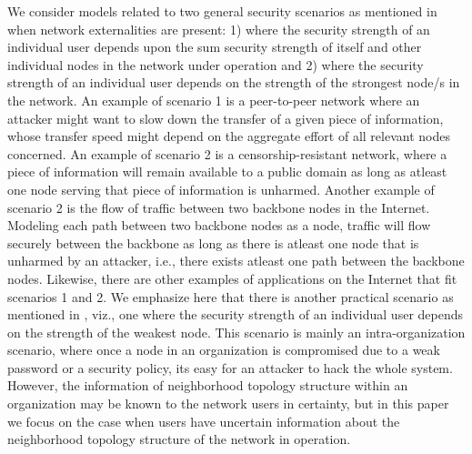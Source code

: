 \documentclass[letterpaper,12pt,onecolumn, nodraft]{IEEEtran}
\begin{document}
We consider models related to two general security scenarios as mentioned in \cite{hvar} when network externalities are present: 1) where the security strength of an individual user depends upon the sum security strength of itself and other individual nodes in the network under operation and 2) where the security strength of an individual user depends on the strength of the strongest node/s in the network. An example of scenario 1 is a peer-to-peer network where an attacker might want to slow down the transfer of a given piece of information, whose transfer speed might depend on the aggregate effort of all relevant nodes concerned. An example of scenario 2 is a censorship-resistant network, where a piece of information will remain available to a public domain as long as atleast one node serving that piece of information is unharmed. Another example of scenario 2 is the flow of traffic between two backbone nodes in the Internet. Modeling each path between two backbone nodes as a node, traffic will flow securely between the backbone as long as there is atleast one node that is unharmed by an attacker, i.e., there exists atleast one path between the backbone nodes. Likewise, there are other examples of  applications on the Internet that fit scenarios 1 and 2.  We emphasize here that there is another practical scenario as mentioned in \cite{hvar}, viz., one where the security strength of an individual user depends on the strength of the weakest node. This scenario is mainly an intra-organization scenario, where once a node in an organization is compromised due to a weak password or a security policy, its easy for an attacker to hack the whole system. However, the information of neighborhood topology structure within an organization may be known to the network users in certainty, but in this paper we focus on the case when users have uncertain information about the neighborhood topology structure of the network in operation.
\end{document}
